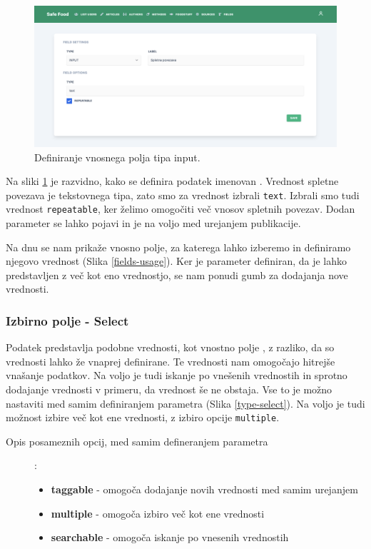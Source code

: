 \documentclass[a4paper, 12pt]{book}
\begin{document}
\begin{figure}[h]
\begin{center}
\includegraphics[width=1\textwidth]{slike/type_input.png}
\end{center}
\caption{ Definiranje vnosnega polja tipa input. }
\label{type-input}
\end{figure}

Na sliki \ref{type-input} je razvidno, kako se definira podatek imenovan . Vrednost spletne povezava je tekstovnega tipa, zato smo za vrednost izbrali \verb=text=. Izbrali smo tudi vrednost \verb=repeatable=, ker želimo omogočiti več vnosov spletnih povezav. Dodan parameter se lahko pojavi in je na voljo med urejanjem publikacije. 

Na dnu se nam prikaže vnosno polje, za katerega lahko izberemo in definiramo njegovo vrednost (Slika \ref{fields-usage}). Ker je parameter definiran, da je lahko predstavljen z več kot eno vrednostjo, se nam ponudi gumb za dodajanja nove vrednosti.

\subsubsection{Izbirno polje - Select}
\label{type-select-page}
Podatek predstavlja podobne vrednosti, kot vnostno polje , z razliko, da so vrednosti lahko že vnaprej definirane. Te vrednosti nam omogočajo hitrejše vnašanje podatkov. Na voljo je tudi iskanje po vnešenih vrednostih in sprotno dodajanje vrednosti v primeru, da vrednost še ne obstaja. Vse to je možno nastaviti med samim definiranjem parametra (Slika \ref{type-select}). Na voljo je tudi možnost izbire več kot ene vrednosti, z izbiro opcije \verb=multiple=.

\begin{description}
\item[Opis posameznih opcij, med samim defineranjem parametra]:
	\begin{itemize}
		\item \textbf{taggable} - omogoča dodajanje novih vrednosti med samim urejanjem
		\item \textbf{multiple} - omogoča izbiro več kot ene vrednosti
		\item \textbf{searchable} - omogoča iskanje po vnesenih vrednostih
	\end{itemize}
\end{description}
\end{document}
